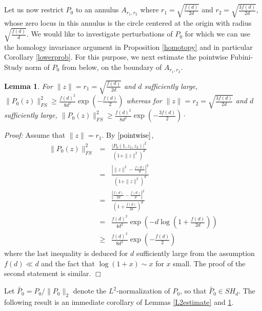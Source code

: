 \documentclass [11pt]{amsart}
\newtheorem {lemma}[theorem]{Lemma}
\theoremstyle{remark}
\numberwithin{equation}{section}
\numberwithin{theorem}{section}
\begin{document}
Let us now restrict $P_{0}$ to an annulus $A_{r_{1},r_{2}}$ where $\displaystyle{r_{1}=\sqrt{\frac{f(d)}{2d}}}$ and $\displaystyle{r_{2}=\sqrt{\frac{3f(d)}{2d}}}$, whose zero locus in this annulus is the circle centered at the origin with radius $\displaystyle{\sqrt{\frac{f(d)}{d}}}$. We would like to investigate perturbations of $P_{0}$ for which we can use the homology invariance argument in Proposition \ref{homotopy} and in particular Corollary \ref{lowerprob}. 
For this purpose, we next estimate the pointwise Fubini-Study norm of $P_{0}$ from below, on the boundary of $A_{r_{1},r_{2}}$. 

\begin{lemma} \label{pointwiseestimate}
For $\displaystyle{\|z\|=r_{1}=\sqrt{\frac{f(d)}{2d}}}$ and $d$ sufficiently large,  
\( \displaystyle{\|P_{0}(z)\|_{FS}^2 \geq  \frac{f(d)^2}{8d^2} \exp\left(  -\frac{f(d)}{2}\right)}\)
whereas for $\displaystyle{ \|z\|=r_{2}= \sqrt{\frac{3f(d)}{2d}}}$ and $d$ sufficiently large, 
\(\displaystyle{ \|P_{0}(z)\|_{FS}^2 \geq  \frac{f(d)^2}{8d^2} \exp\left(  -\frac{3f(d)}{2}\right)}\cdot\)
\end{lemma}    

\noindent\textit{Proof:} Assume that $\|z\|=r_{1}$. By  $\eqref{pointwise}$, 
\begin{eqnarray} 
\|P_{0}(z)\|_{FS}^2 &=& \frac{|P_{0}(1,z_{1},z_{2})|^2}{(1+\|z\|^2)^d} \nonumber \\
&=& \frac{ \left| \|z\|^2-\frac{f(d)}{d}\right|^2}{(1+\|z\|^2)^d} \nonumber\\
&=&      \frac{ \left|  \frac{f(d)}{2d}-\frac{f(d)}{d}  \right|^2     }{ \left(1+   \frac{f(d)}{2d}\right)^d } \nonumber    \\
&=&  \frac{ f(d)^2}{4d^2} \exp\left(-d\log\left(1+\frac{f(d)}{2d}\right)\right) \label{infbound} \\
&\geq&  \frac{f(d)^2}{8d^2} \exp\left(  -\frac{f(d)}{2} \right) \nonumber
\end{eqnarray}
where the last inequality is deduced for $d$ sufficiently large from the assumption $f(d)\ll d$ and the fact that $\log(1+x)\sim x$ for $x$ small. The proof of the second statement is similar. \hfill $\Box$

Let $\displaystyle{\widetilde{P_{0}}}=P_{0}/\|P_{0}\|_{2}$ denote the $L^2$-normalization of $P_{0}$, so that $\displaystyle{\widetilde{P_{0}}\in SH_{d}}$. The following result is an immediate corollary of Lemmas \ref{L2estimate} and \ref{pointwiseestimate}.
\end{document}
